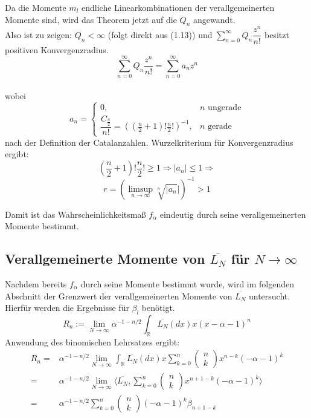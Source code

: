 \documentclass[a4paper, 11pt]{scrreprt}
\newcommand{\RR}{\mathbb{R}}
\begin{document}
Da die Momente $ m_l $ endliche Linearkombinationen der verallgemeinerten Momente sind, wird das Theorem jetzt auf die $ Q_n $ angewandt.\\
Also ist zu zeigen: $ Q_n< \infty $ (folgt direkt aus (1.13)) und $ \sum_{n=0}^{\infty} Q_n \dfrac{z^n}{n!}$ besitzt positiven Konvergenzradius.\\
\[ \sum_{n=0}^{\infty} Q_n \dfrac{z^n}{n!}= \sum_{n=0}^{\infty} a_n z^n\]\\
wobei \[ a_n=\begin{cases} 0, &n\text{ ungerade}\\
	\dfrac{C_{\frac n 2}}{n!}=((\frac{n}{2}+1)!\frac{n}{2}!)^{-1}, &n\text{ gerade} \end{cases} \]
	nach der Definition der Catalanzahlen.
	Wurzelkriterium für Konvergenzradius ergibt: 
	\[(\frac{n}{2}+1)!\frac{n}{2}! \geq 1 \Rightarrow \vert a_n \vert \leq 1 \Rightarrow \]
	\[ r=(\limsup_{n \to \infty} \sqrt[n]{\vert a_n} \vert )^{-1} >1 \]

Damit ist das Wahrscheinlichkeitsmaß $f_\alpha  $ eindeutig durch seine verallgemeinerten Momente bestimmt.

\subsection*{Verallgemeinerte Momente von $ \overline{L_N} $ für $ N \to \infty $}
Nachdem bereits $ f_\alpha $ durch seine Momente bestimmt wurde, wird im folgenden Abschnitt der Grenzwert der verallgemeinerten Momente von $ \overline{L_N} $ untersucht. Hierfür werden die Ergebnisse für $ \beta_l $ benötigt.\\
\begin{equation}
R_n:=\lim_{N \to \infty} \alpha^{-1-n/2} \int_{\RR}\overline{L_{N}}(dx)x(x-\alpha-1)^{n} 
\end{equation}
Anwendung des binomischen Lehrsatzes ergibt:
\begin{equation}
 \begin{split}
 R_n =& \alpha^{-1-n/2} \lim_{N \to \infty} \int_{\RR}\overline{L_{N}}(dx)x \sum_{k=0}^n \begin{pmatrix} n\\k\end{pmatrix} x^{n-k}(-\alpha -1)^k \\
 =& \alpha^{-1-n/2} \lim_{N \to \infty} \langle \overline{L_{N}}, \sum_{k=0}^n \begin{pmatrix} n\\k\end{pmatrix} x^{n+1-k}(-\alpha -1)^k \rangle \\
 =& \alpha^{-1-n/2}\sum_{k=0}^n \begin{pmatrix} n\\k\end{pmatrix} (-\alpha -1)^k \beta_{n+1-k}
 \end{split}
\end{equation}
\end{document}
